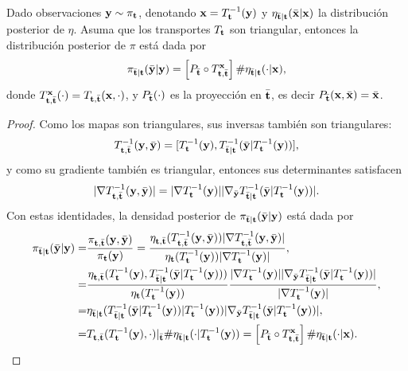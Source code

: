 \begin{proposition}
	\label{prop_triangular}
	Dado observaciones \(\bfy \sim \pi_{\bft}\), denotando \(\bfx = T_{\bft}^{-1}(\bfy)\) y \(\eta_{\bfto|\bft}(\bfxo|\bfx)\) la distribución posterior de \(\eta\). Asuma que los transportes \(T_{\bft}\) son triangular, entonces la distribución posterior de \(\pi\) está dada por
	\begin{align}
	\pi_{\bfto|\bft}(\bfyo|\bfy) = \left[P_{\bfto} \circ T_{\bft,\bfto}^{\bfx}\right]\#\eta_{\bfto|\bft}(\cdot|\bfx),
	\end{align}
	donde \(T_{\bft,\bfto}^{\bfx}(\cdot) = T_{\bft,\bfto}(\bfx,\cdot)\), y \(P_{\bfto}(\cdot)\) es la proyección en \(\bfto\), es decir \(P_{\bfto}(\bfx, \bfxo) = \bfxo\).
	\begin{proof}
		Como los mapas son triangulares, sus inversas también son triangulares: \[T_{\bft,\bfto}^{-1}(\bfy, \bfyo) = [T_{\bft}^{-1}(\bfy), T_{\bfto|\bft}^{-1}(\bfyo|T_{\bft}^{-1}(\bfy))],\] y como su gradiente también es triangular, entonces sus determinantes satisfacen \[|\nabla T_{\bft,\bfto}^{-1}(\bfy, \bfyo)| = |\nabla T_{\bft}^{-1}(\bfy)| |\nabla_{\bfyo} T_{\bfto|\bft}^{-1}(\bfyo|T_{\bft}^{-1}(\bfy))|.\] Con estas identidades, la densidad posterior de \(\pi_{\bfto|\bft}(\bfyo|\bfy)\) está dada por
		\begin{align*}
			\pi_{\bfto|\bft}(\bfyo|\bfy) =& \frac{\pi_{\bft, \bfto}(\bfy, \bfyo)}{\pi_{\bft}(\bfy)} =  \frac{\eta_{\bft, \bfto}(T_{\bft,\bfto}^{-1}(\bfy, \bfyo))|\nabla T_{\bft, \bfto}^{-1}( \bfy, \bfyo)|}{\eta_{\bft}(T_{\bft}^{-1}(\bfy))|\nabla T_{\bft}^{-1}(\bfy)|},\\
			=& \frac{\eta_{\bft,\bfto}(T_{\bft}^{-1}(\bfy),T_{\bfto|\bft}^{-1}(\bfyo|T_{\bft}^{-1}(\bfy)))}{\eta_{\bft}(T_{\bft}^{-1}(\bfy))} \frac{|\nabla T_{\bft}^{-1}(\bfy)| |\nabla_{\bfyo} T_{\bfto|\bft}^{-1}(\bfyo|T_{\bft}^{-1}(\bfy))|}{|\nabla T_{\bft}^{-1}(\bfy)|},\\ =& \eta_{\bfto|\bft}(T_{\bfto|\bft}^{-1}(\bfyo|T_{\bft}^{-1}(\bfy))|T_{\bft}^{-1}(\bfy)) |\nabla_{\bfyo} T_{\bfto|\bft}^{-1}(\bfyo|T_{\bft}^{-1}(\bfy))|, \\
			=& T_{\bft,\bfto}(T_{\bft}^{-1}(\bfy), \cdot)|_{\bfto}\#\eta_{\bfto|\bft}(\cdot|T_{\bft}^{-1}(\bfy))
			= \left[P_{\bfto} \circ T_{\bft,\bfto}^{\bfx}\right]\#\eta_{\bfto|\bft}(\cdot|\bfx).
		\end{align*}
	\end{proof}	
	
\end{proposition}


